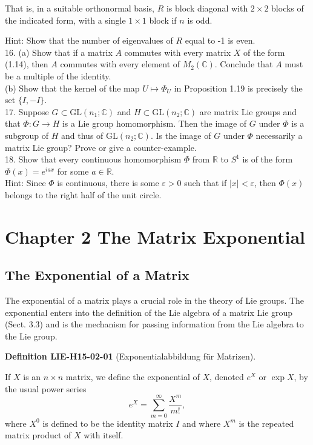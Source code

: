 \documentclass[10pt, letterpaper]{article}
\newcommand{\CustomHeading}[3]{%
  \par\medskip\noindent%
  \textbf{#1 #2} \textnormal{(#3)}.\enskip%
}
\newenvironment{DEF}[2]{\begin{unitbox}\CustomHeading{Definition}{#1}{#2}}{\end{unitbox}}
\begin{document}
That is, in a suitable orthonormal basis, $R$ is block diagonal with $2 \times 2$ blocks of the indicated form, with a single $1 \times 1$ block if $n$ is odd.

Hint: Show that the number of eigenvalues of $R$ equal to -1 is even.\\
16. (a) Show that if a matrix $A$ commutes with every matrix $X$ of the form (1.14), then $A$ commutes with every element of $M_{2}(\mathbb{C})$. Conclude that $A$ must be a multiple of the identity.\\
(b) Show that the kernel of the map $U \mapsto \Phi_{U}$ in Proposition 1.19 is precisely the set $\{I,-I\}$.\\
17. Suppose $G \subset \mathrm{GL}\left(n_{1} ; \mathbb{C}\right)$ and $H \subset \mathrm{GL}\left(n_{2} ; \mathbb{C}\right)$ are matrix Lie groups and that $\Phi: G \rightarrow H$ is a Lie group homomorphism. Then the image of $G$ under $\Phi$ is a subgroup of $H$ and thus of $\mathrm{GL}\left(n_{2} ; \mathbb{C}\right)$. Is the image of $G$ under $\Phi$ necessarily a matrix Lie group? Prove or give a counter-example.\\
18. Show that every continuous homomorphism $\Phi$ from $\mathbb{R}$ to $S^{1}$ is of the form $\Phi(x)=e^{i a x}$ for some $a \in \mathbb{R}$.\\
Hint: Since $\Phi$ is continuous, there is some $\varepsilon>0$ such that if $|x|<\varepsilon$, then $\Phi(x)$ belongs to the right half of the unit circle.



\pagebreak



\section*{Chapter 2 The Matrix Exponential}


\subsection*{The Exponential of a Matrix}



The exponential of a matrix plays a crucial role in the theory of Lie groups. The exponential enters into the definition of the Lie algebra of a matrix Lie group (Sect. 3.3) and is the mechanism for passing information from the Lie algebra to the Lie group.



\begin{DEF}{LIE-H15-02-01}{Exponentialabbildung für Matrizen}
If $X$ is an $n \times n$ matrix, we define the exponential of $X$, denoted $e^{X}$ or $\exp X$, by the usual power series
$$
e^{X}=\sum_{m=0}^{\infty} \frac{X^{m}}{m!},
$$
where $X^{0}$ is defined to be the identity matrix $I$ and where $X^{m}$ is the repeated matrix product of $X$ with itself.
\end{DEF}
\end{document}
